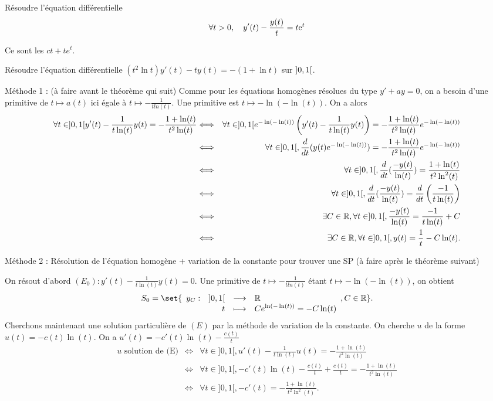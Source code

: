 \documentclass{magnolia}
\begin{document}
\begin{exos}
\exo Résoudre l'équation différentielle
  \[\forall t>0 ,\quad y'(t)-\frac{y(t)}{t}=t{\rm e}^t\]
  \begin{sol}
  Ce sont les $ct+te^t$.
  \end{sol}
\exo Résoudre l'équation différentielle
  $(t^2\ln t)y'(t)-ty(t)=-(1+\ln t)$ sur $\left]0,1\right[$.
  \begin{victor}
  \begin{sol}
  Méthode 1 : (à faire avant le théorème qui suit)
  Comme pour les équations homogènes résolues du type $y'+ay=0$, on a besoin d'une primitive de $t\mapsto a(t)$ ici égale à $t\mapsto -\frac{1}{tln(t)}$. Une primitive est $t\mapsto -\ln(-\ln(t))$. On a alors
  \begin{eqnarray*}
\forall t \in ]0,1[ y'(t)-\frac{1}{t\ln(t)} y(t)=-\frac{1+\ln(t)}{t^2\ln(t)} &\Longleftrightarrow& \forall t \in ]0,1[ e^{-\ln(-\ln(t))}\left(y'(t)-\frac{1}{t\ln(t)} y(t)\right)=-\frac{1+\ln(t)}{t^2\ln(t)}e^{-\ln(-\ln(t))} \\
&\Longleftrightarrow& \forall t \in ]0,1[, \frac{d}{dt}(y(t)e^{-\ln(-\ln(t))})=-\frac{1+\ln(t)}{t^2\ln(t)}e^{-\ln(-\ln(t))} \\
&\Longleftrightarrow& \forall t \in ]0,1[, \frac{d}{dt}(\frac{-y(t)}{\ln(t)})=\frac{1+\ln(t)}{t^2\ln^2(t)} \\
&\Longleftrightarrow& \forall t \in ]0,1[, \frac{d}{dt}(\frac{-y(t)}{\ln(t)})=\frac{d}{dt}\left(\frac{-1}{t\ln(t)}\right) \\
&\Longleftrightarrow& \exists C\in \mathbb{R}, \forall t \in ]0,1[, \frac{-y(t)}{\ln(t)}=\frac{-1}{t\ln(t)}+C\\
&\Longleftrightarrow& \exists C\in \mathbb{R}, \forall t \in ]0,1[, y(t)=\frac{1}{t}-C\ln(t).
\end{eqnarray*}
  
  Méthode 2 : Résolution de l'équation homogène + variation de la constante pour trouver une SP (à faire après le théorème suivant)
  
  On résout d'abord $(E_0): y'(t)-\frac{1}{t\ln(t)} y(t)=0$.
  Une primitive de $t\mapsto -\frac{1}{tln(t)}$ étant $t\mapsto -\ln(-\ln(t))$, on obtient $$S_0=\set{\dspappli{y_C}{]0,1[}{\R}{t}{Ce^{\ln(-\ln(t))}=-C\ln(t)}, C\in \R}.$$
  Cherchons maintenant une solution particulière de $(E)$ par la méthode de variation de la constante. On cherche $u$ de la forme $u(t)=-c(t)\ln(t)$. On a $u'(t)=-c'(t)\ln(t)-\frac{c(t)}{t}$
  \begin{eqnarray*}
  u \text{ solution de (E)} &\Longleftrightarrow & \forall t \in ]0,1[, u'(t)-\frac{1}{t\ln(t)}u(t)=-\frac{1+\ln(t)}{t^2\ln(t)}\\
  &\Longleftrightarrow & \forall t \in ]0,1[, -c'(t)\ln(t)-\frac{c(t)}{t}+\frac{c(t)}{t}=-\frac{1+\ln(t)}{t^2\ln(t)}\\
  &\Longleftrightarrow & \forall t \in ]0,1[, -c'(t)=-\frac{1+\ln(t)}{t^2\ln^2(t)}.
  \end{eqnarray*}
  

\end{sol}
\end{victor}
\end{exos}
\end{document}
